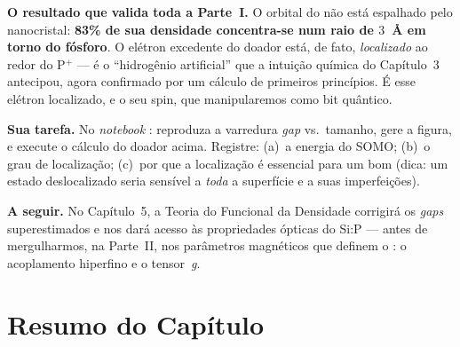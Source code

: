 \begin{caixaancora}
\textbf{O resultado que valida toda a Parte~I.} O orbital do \qubit{} não está
espalhado pelo nanocristal: \textbf{83\% de sua densidade concentra-se num raio de
$3$~Å em torno do fósforo}. O elétron excedente do doador está, de fato,
\emph{localizado} ao redor do P$^+$ --- é o ``hidrogênio artificial'' que a
intuição química do Capítulo~3 antecipou, agora confirmado por um cálculo de
primeiros princípios. É esse elétron localizado, e o seu spin, que
manipularemos como bit quântico.

\vspace{0.3cm}
\textbf{Sua tarefa.} No \emph{notebook} :
reproduza a varredura \emph{gap} vs.\ tamanho, gere a figura, e execute o cálculo
do doador acima. Registre: (a)~a energia do SOMO; (b)~o grau de localização;
(c)~por que a localização é essencial para um bom \qubit{} (dica: um estado
deslocalizado seria sensível a \emph{toda} a superfície e a suas imperfeições).

\vspace{0.3cm}
\textbf{A seguir.} No Capítulo~5, a Teoria do Funcional da Densidade corrigirá os
\emph{gaps} superestimados e nos dará acesso às propriedades ópticas do Si:P ---
antes de mergulharmos, na Parte~II, nos parâmetros magnéticos que definem o
\qubit{}: o acoplamento hiperfino e o tensor~\emph{g}.
\end{caixaancora}

\section*{Resumo do Capítulo}


